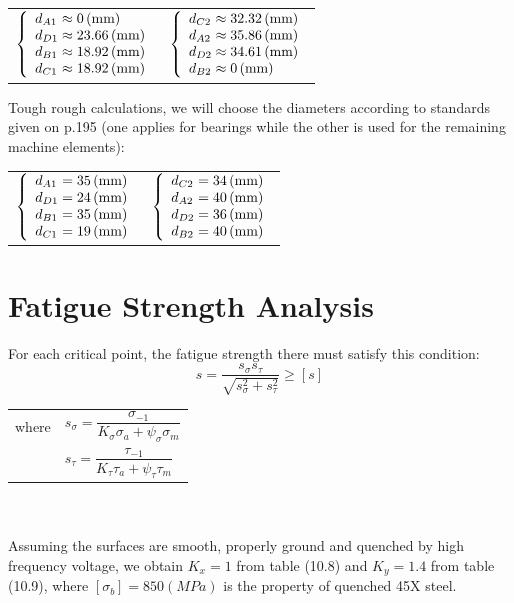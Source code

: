 \begin{tabular}{p{7cm}p{7cm}}
	$
	\left\{ 
	\begin{array}{l@{{} \approx {}}l}
	d_{A1} & 0 \unit{(mm)}\\
	d_{D1} & 23.66 \unit{(mm)}\\
	d_{B1} & 18.92 \unit{(mm)}\\
	d_{C1} & 18.92 \unit{(mm)}\\
	\end{array}
	\right.
	$ &
	$
	\left\{ 
	\begin{array}{l@{{} \approx {}}l}
	d_{C2} & 32.32 \unit{(mm)}\\
	d_{A2} & 35.86 \unit{(mm)}\\
	d_{D2} & 34.61 \unit{(mm)}\\
	d_{B2} & 0\unit{(mm)}\\
	\end{array}
	\right.
	$
\end{tabular}

Tough rough calculations, we will choose the diameters according to standards given on p.195 (one applies for bearings while the other is used for the remaining machine elements):

\begin{tabular}{p{7cm}p{7cm}}
	$
	\left\{ 
	\begin{array}{l@{{} = {}}l}
	d_{A1} & 35 \unit{(mm)}\\
	d_{D1} & 24 \unit{(mm)}\\
	d_{B1} & 35 \unit{(mm)}\\
	d_{C1} & 19 \unit{(mm)}\\
	\end{array}
	\right.
	$ &
	$
	\left\{ 
	\begin{array}{l@{{} = {}}l}
	d_{C2} & 34 \unit{(mm)}\\
	d_{A2} & 40 \unit{(mm)}\\
	d_{D2} & 36 \unit{(mm)}\\
	d_{B2} & 40 \unit{(mm)}\\
	\end{array}
	\right.
	$
\end{tabular}

\section{Fatigue Strength Analysis}
For each critical point, the fatigue strength there must satisfy this condition:
\[s=\dfrac{s_\sigma s_\tau}{\sqrt{s_\sigma^2+s_\tau^2}}\geq[s]\]
\begin{tabular}{ll}
	where & $ s_\sigma = \dfrac{\sigma_{-1}}{K_\sigma\sigma_a + \psi_\sigma\sigma_m}$\\
	& $ s_\tau = \dfrac{\tau_{-1}}{K_\tau\tau_a + \psi_\tau\tau_m}$
\end{tabular}\\\\
Assuming the surfaces are smooth, properly ground and quenched by high frequency voltage, we obtain $ K_x = 1 $ from table (10.8) and $ K_y = 1.4 $ from table (10.9), where $ [\sigma_b] = 850 \unit{(MPa)} $ is the property of quenched 45X steel.

